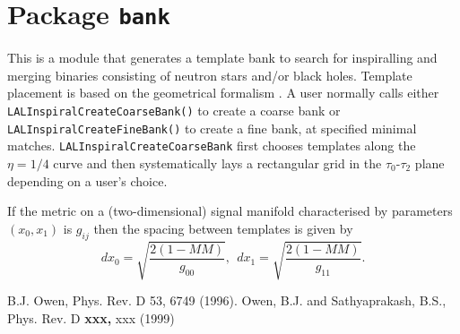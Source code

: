 \chapter{Package \texttt{bank}}

This is a module that generates a template bank to search for
inspiralling and merging binaries consisting of neutron stars
and/or black holes. Template placement is based on the geometrical
formalism \cite{owen:96,OwenAndSathyaprakash:99}.  A user normally
calls either \texttt{LALInspiralCreateCoarseBank()} 
to create a coarse bank or \texttt{LALInspiralCreateFineBank()} 
to create a fine bank, at specified minimal matches.  
\texttt{LALInspiralCreateCoarseBank} first chooses templates
along the $\eta=1/4$ curve and then systematically lays a 
rectangular grid in the $\tau_0$-$\tau_2$ plane depending on a
user's choice.

If the metric on a (two-dimensional) signal manifold characterised 
by parameters $(x_0,x_1)$ is $g_{ij}$ then the spacing between templates 
is given by
\begin{equation}
   dx_0 = \sqrt{ \frac{2(1 -MM)}{g_{00}} },\ \ 
   dx_1 = \sqrt{ \frac{2(1 -MM)}{g_{11}} }.
\end{equation}
 
\newpage

\begin{thebibliography}{}
 B.J. Owen, Phys. Rev. D 53, 6749 (1996).
Owen, B.J. and Sathyaprakash, B.S., Phys. Rev. D {\bf xxx,} xxx (1999) 
\end{thebibliography}
